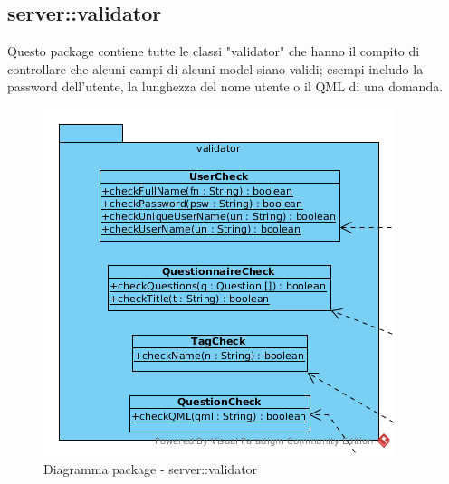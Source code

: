 \begin{description}
\begin{itemize}
\end{itemize}

\end{description}

\vspace{0.5cm}
\subsection{server::validator}
Questo package contiene tutte le classi "validator" che hanno il compito di controllare che alcuni campi di alcuni model siano validi; esempi includo la password dell'utente, la lunghezza del nome utente o il QML di una domanda.\begin{center}
		\begin{figure}[H]
			\centering \includegraphics[scale=4, max width=\textwidth, max height=\myheight]{../img/diagrammiClassi/server/validator.png}
			\caption{Diagramma package - server::validator}
		\end{figure}
	\end{center}\hypertarget{server::validator::UserCheck}{}
